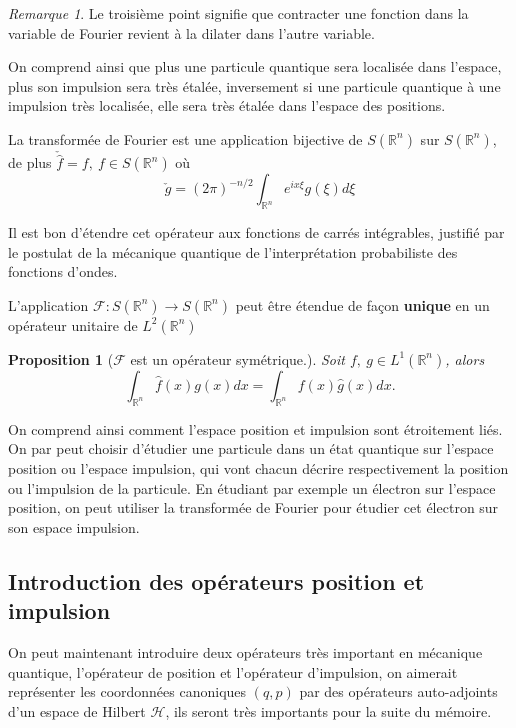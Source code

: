 \documentclass[a4paper, 12pt]{report}
\newcommand{\R}{\mathbb{R}} %
\renewcommand{\.}{\cdot} %
\theoremstyle{break}
\newtheorem{proposition}{Proposition}
\theoremstyle{remark}
\newtheorem{remark}{Remarque}
\theoremstyle{proofstyle}
\begin{document}
\begin{remark}
    Le troisième point signifie que contracter une fonction dans la variable de Fourier revient à la dilater dans l'autre variable.
\end{remark}
On comprend ainsi que plus une particule quantique sera localisée dans l'espace, plus son impulsion sera très étalée, inversement si une particule quantique à une impulsion très localisée, elle sera très étalée dans l'espace des positions.


\begin{theorem}
    La transformée de Fourier est une application bijective de $S(\mathbb{R}^n)$ sur $S(\mathbb{R}^n)$, de plus $\check{\hat{f}} = f, ~f \in S(\mathbb{R}^n)$ où
    $$ \check{g} = (2 \pi)^{-n/2} \int _{\mathbb{R}^n} e^{ix \xi} g( \xi) d \xi$$
\end{theorem}

Il est bon d'étendre cet opérateur aux fonctions de carrés intégrables, justifié par le postulat de la mécanique quantique de l'interprétation probabiliste des fonctions d'ondes.

\begin{theorem}
    L'application $\mathcal{F} : S(\mathbb{R}^n) \rightarrow S(\mathbb{R}^n)$ peut être étendue de façon \textbf{unique} en un opérateur unitaire de $L^2(\mathbb{R}^n)$
\end{theorem}

\begin{proposition}[$\mathcal{F}$ est un opérateur symétrique.]
    Soit $f,~ g \in L^1(\R^n)$, alors
    $$\int_{\R^n}  \hat{f} (x) g(x) dx = \int_{\R^n} f(x) \hat{g} (x) dx.$$
\end{proposition}

On comprend ainsi comment l'espace position et impulsion sont étroitement liés. On par peut choisir d'étudier une particule dans un état quantique sur l'espace position ou l'espace impulsion, qui vont chacun décrire respectivement la position ou l'impulsion de la particule. En étudiant par exemple un électron sur l'espace position, on peut utiliser la transformée de Fourier pour étudier cet électron sur son espace impulsion.

\subsection{Introduction des opérateurs position et impulsion}

On peut maintenant introduire deux opérateurs très important en mécanique quantique, l'opérateur de position et l'opérateur d'impulsion, on aimerait représenter les coordonnées canoniques $(q,p)$ par des opérateurs auto-adjoints d'un espace de Hilbert $\mathcal{H}$, ils seront très importants pour la suite du mémoire. \vspace{10 pt}
\end{document}
